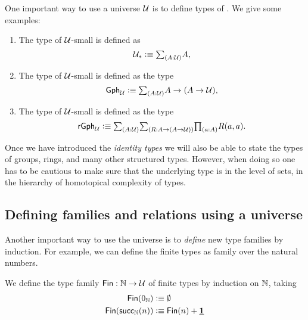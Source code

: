 \begin{eg}
One important way to use a universe $\mathcal{U}$ is to define types of . We give some examples:
\begin{enumerate}
\item The type of $\mathcal{U}$-small  is defined as
\begin{equation*}
\UU_\ast\defeq \sm{A:\UU}A,
\end{equation*}
\item The type of $\mathcal{U}$-small  is defined as the type
\begin{equation*}
\mathsf{Gph}_\UU \defeq \sm{A:\UU} A\to (A\to \UU),
\end{equation*}
\item The type of $\mathcal{U}$-small  is defined as the type
\begin{equation*}
\mathsf{rGph}_\UU \defeq \sm{A:\UU}{R:A\to (A\to \UU)}\prd{a:A}R(a,a).
\end{equation*}
\end{enumerate}
Once we have introduced the \emph{identity types} we will also be able to state the types of groups, rings, and many other structured types. However, when doing so one has to be cautious to make sure that the underlying type is in the level of sets, in the hierarchy of homotopical complexity of types.
\end{eg}

\subsection{Defining families and relations using a universe}
Another important way to use the universe is to \emph{define} new type families by induction. For example, we can define the finite types as family over the natural numbers.

\begin{defn}\label{defn:fin}
We define the type family $\mathsf{Fin}:{\mathbb{N}}\to\mathcal{U}$ of finite types by induction on ${\mathbb{N}}$, taking
\begin{align*}
\mathsf{Fin}(0_{{\mathbb{N}}}) & \vcentcolon\equiv \emptyset \\
\mathsf{Fin}(\mathsf{succ}_{{\mathbb{N}}}(n)) & \vcentcolon\equiv \mathsf{Fin}(n)+\underline{\mathbf{1}}
\end{align*}
\end{defn}

